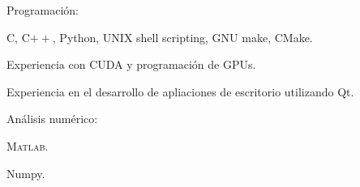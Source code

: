 \documentclass[10pt]{article}
\renewcommand{\section}[1]{\pagebreak[3]%
    \vspace{1.3\baselineskip}%
    \phantomsection\addcontentsline{toc}{section}{#1}%
    \noindent\llap{\scshape\smash{\parbox[t]{\marginparwidth}{\hyphenpenalty=10000\raggedright #1}}}%
    \vspace{-\baselineskip}\par}
\newcommand{\halfblankline}{\quad\vspace{-0.5\baselineskip}\pagebreak[3]}
\providecommand\Matlab{\textsc{Matlab}}
\begin{document}
Programación:
%
\begin{innerlist}
    \item C, C$++$, Python, UNIX shell scripting, GNU make, CMake.
    \item Experiencia con CUDA y programación de GPUs.
    \item Experiencia en el desarrollo de apliaciones de escritorio utilizando Qt.
\end{innerlist}

\halfblankline

Análisis numérico:
%
\begin{innerlist}
    \item \Matlab.
    \item Numpy.
\end{innerlist}

%
\end{document}
